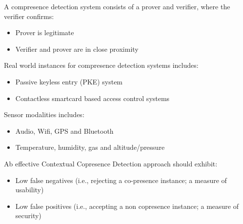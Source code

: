 A compresence detection system consists of a prover and verifier, where the
verifier confirms:
\begin{itemize}
  \item Prover is legitimate
  \item Verifier and prover are in close proximity
\end{itemize}
Real world instances for compresence detection systems includes:
\begin{itemize}
  \item Passive keyless entry (PKE) system
  \item Contactless smartcard based access control systems
\end{itemize}
Sensor modalities includes:
\begin{itemize}
  \item Audio, Wifi, GPS and Bluetooth
  \item Temperature, humidity, gas and altitude/pressure
\end{itemize}
Ab effective Contextual Copresence Detection approach should exhibit:
\begin{itemize}
  \item Low false negatives (i.e., rejecting a co-presence instance; a measure
of usability)
  \item Low false positives (i.e., accepting a non copresence instance; a
measure of security)
\end{itemize}
